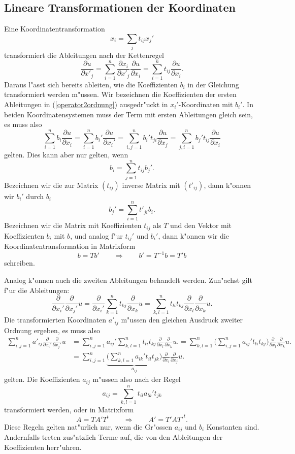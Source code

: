 \subsection{Lineare Transformationen der Koordinaten
\label{lineare-transformation}}
Eine Koordinatentransformation
\[
x_i=\sum_{j}t_{ij}x_j'
\]
transformiert die Ableitungen nach der Kettenregel
\[
\frac{\partial u}{\partial x'_j}
=
\sum_{i=1}^n
\frac{\partial x_i}{\partial x'_j} \frac{\partial u}{\partial x_i}
=
\sum_{i=1}^nt_{ij}\frac{\partial u}{\partial x_i}.
\]
Daraus l"asst sich bereits ableiten, wie die Koeffizienten $b_i$ in der
Gleichung transformiert werden m"ussen.
Wir bezeichnen die Koeffizienten der ersten Ableitungen in
(\ref{operator2ordnung}) ausgedr"uckt in $x_i'$-Koordinaten mit
$b_i'$.
In beiden Koordinatensystemen muss der Term mit ersten Ableitungen gleich
sein, es muss also
\[
\sum_{i=1}^n b_i\frac{\partial u}{\partial x_i}
=
\sum_{i=1}^n b_i'\frac{\partial u}{\partial x_i'}
=
\sum_{i,j=1}^n b_i't_{ji}\frac{\partial u}{\partial x_j}
=
\sum_{j,i=1}^n b_j't_{ij}\frac{\partial u}{\partial x_i}
\]
gelten.
Dies kann aber nur gelten, wenn
\[
b_i = \sum_{j=1}^n t_{ij}b_j'.
\]
Bezeichnen wir die zur Matrix $(t_{ij})$ inverse Matrix mit $(t'_{ij})$,
dann k"onnen wir $b_i'$ durch $b_i$ 
\[
b_j'=\sum_{i=1}^n t'_{ji}b_i.
\]
Bezeichnen wir die Matrix mit Koeffizienten $t_{ij}$ als $T$ und den 
Vektor mit Koeffizienten $b_i$ mit $b$, und analog f"ur $t_{ij}'$ und
$b_i'$, dann k"onnen wir die Koordinatentransformation in Matrixform
\[
b=Tb'
\qquad\Rightarrow\qquad
b'=T^{-1}b=T'b
\]
schreiben.

Analog k"onnen auch die zweiten Ableitungen behandelt werden.
Zun"achst gilt f"ur die Ableitungen:
\[
\frac{\partial}{\partial x_i'}\frac{\partial}{\partial x_j'} u
=
\frac{\partial}{\partial x_i'}
\sum_{k=1}^nt_{kj}\frac{\partial}{\partial x_k}u
=
\sum_{k,l=1}^nt_{li}t_{kj}\frac{\partial}{\partial x_l}\frac{\partial}{\partial x_k}u.
\]
Die transformierten Koordinaten $a'_{ij}$ m"ussen den gleichen Ausdruck
zweiter Ordnung ergeben, es muss also
\begin{align*}
\sum_{i,j=1}^n
a'_{ij}\frac{\partial}{\partial x_i'}\frac{\partial}{\partial x_j'} u
&=
\sum_{i,j=1}^n
a_{ij}'
\sum_{k,l=1}^n
t_{li}t_{kj}\frac{\partial}{\partial x_l}\frac{\partial}{\partial x_k}u.
=
\sum_{k,l=1}^n
\biggl(
\sum_{i,j=1}^n
a_{ij}'
t_{li}t_{kj}
\biggr)
\frac{\partial}{\partial x_l}\frac{\partial}{\partial x_k}u.
\\
&=
\sum_{i,j=1}^n
\underbrace{
\biggl(
\sum_{k,l=1}^n
a_{lk}'
t_{il}t_{jk}
\biggr)}_{\textstyle a_{ij}}
\frac{\partial}{\partial x_i}\frac{\partial}{\partial x_j}u.
\end{align*}
gelten.
Die Koeffizienten $a_{ij}$ m"ussen also nach der Regel
\[
a_{ij}=\sum_{k,l=1}^n t_{il}a_{lk}'t_{jk}
\]
transformiert werden, oder in Matrixform
\[
A=TA'T^t
\qquad\Rightarrow\qquad
A'=T'AT'^t.
\]
Diese Regeln gelten nat"urlich nur, wenn die Gr"ossen $a_{ij}$ und $b_i$
Konstanten sind.
Andernfalls treten zus"atzlich Terme auf, die von den Ableitungen der
Koeffizienten herr"uhren.

